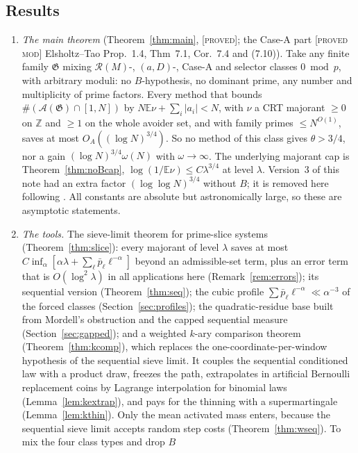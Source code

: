 \documentclass[10pt,reqno]{amsart}
\theoremstyle{definition}
\theoremstyle{remark}
\newcommand{\A}{\mathcal A}
\newcommand{\cR}{\mathscr R}
\newcommand{\cG}{\mathfrak G}
\newcommand{\E}{\mathbb E}
\newcommand{\Z}{\mathbb Z}
\newcommand{\lab}[1]{\textup{[\textsc{#1}]}}
\begin{document}
\subsection*{Results}
\begin{enumerate}
\item \emph{The main theorem} (Theorem~\ref{thm:main}, \lab{proved}; the
  Case-A part \lab{proved mod} Elsholtz--Tao Prop.~1.4, Thm~7.1, Cor.~7.4
  and (7.10)).  Take any finite family $\cG$ mixing $\cR(M)$-, $(a,D)$-,
  Case-A and selector classes $0\bmod p$, with arbitrary moduli: no
  $B$-hypothesis, no dominant prime, any number and multiplicity of
  prime factors.  Every method that bounds $\#(\A(\cG)\cap[1,N])$ by
  $N\E\nu+\sum_i|a_i|<N$, with $\nu$ a CRT majorant $\geq0$ on $\Z$ and $\geq1$ on
  the whole avoider set, and with family primes $\leq N^{O(1)}$, saves at
  most $O_A((\log N)^{3/4})$.  So no method of this class gives
  $\theta>3/4$, nor a gain $(\log N)^{3/4}\omega(N)$ with $\omega\to\infty$.  The
  underlying majorant cap is Theorem~\ref{thm:noBcap},
  $\log(1/\E\nu)\leq C\lambda^{3/4}$ at level $\lambda$.  Version~3 of this note had
  an extra factor $(\log\log N)^{3/4}$ without $B$; it is removed here
  following \cite{KA3}.  All constants are absolute but astronomically
  large, so these are asymptotic statements.
\item \emph{The tools.}  The sieve-limit theorem for prime-slice systems
  (Theorem~\ref{thm:slice}): every majorant of level $\lambda$ saves at
  most $C\inf_\alpha[\alpha\lambda+\sum_\ell\bar p_\ell\ell^{-\alpha}]$ beyond
  an admissible-set term, plus an error term that is $O(\log^2\lambda)$ in
  all applications here (Remark~\ref{rem:errors}); its sequential
  version (Theorem~\ref{thm:seq}); the cubic profile
  $\sum\bar p_\ell\ell^{-\alpha}\ll\alpha^{-3}$ of the forced classes
  (Section~\ref{sec:profiles}); the quadratic-residue base built from
  Mordell's obstruction and the capped sequential measure
  (Section~\ref{sec:gapped}); and a weighted $k$-ary comparison theorem
  (Theorem~\ref{thm:kcomp}), which replaces the one-coordinate-per-window
  hypothesis of the sequential sieve limit.  It couples the sequential
  conditioned law with a product draw, freezes the path, extrapolates in
  artificial Bernoulli replacement coins by Lagrange interpolation for
  binomial laws (Lemma~\ref{lem:kextrap}), and pays for the thinning with
  a supermartingale (Lemma~\ref{lem:kthin}).  Only the mean activated mass
  enters, because the sequential sieve limit accepts random step costs
  (Theorem~\ref{thm:wseq}).  To mix the four class types and drop $B$

\end{enumerate}
\end{document}
